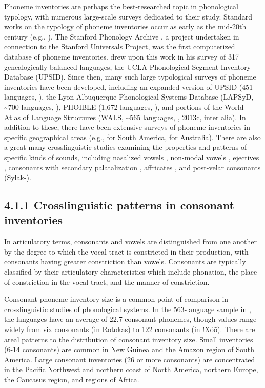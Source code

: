   Phoneme inventories are perhaps the best-researched topic in phonological typology, with numerous large-scale surveys dedicated to their study. Standard works on the typology of phoneme inventories occur as early as the mid-20th century (e.g., \citealt{Hockett1955}). The Stanford Phonology Archive \citep{CrothersEtAl1979}, a project undertaken in connection to the Stanford Universals Project, was the first computerized database of phoneme inventories. \citet{Maddieson1984} drew upon this work in his survey of 317 genealogically balanced languages, the UCLA Phonological Segment Inventory Database (UPSID). Since then, many such large typological surveys of phoneme inventories have been developed, including an expanded version of UPSID (451 languages, \citealt{MaddiesonPrecoda1990}), the Lyon-Albuquerque Phonological Systems Database (LAPSyD, {\textasciitilde}700 languages, \citealt{MaddiesonEtAl2013}), PHOIBLE (1,672 languages, \citealt{MoranEtAl2014}), and portions of the World Atlas of Language Structures (WALS, {\textasciitilde}565 languages, \citealt{Maddieson2013b}, 2013c, inter alia). In addition to these, there have been extensive surveys of phoneme inventories in specific geographical areas (e.g., \citealt{MichaelEtAl2015} for South America, \citealt{GasserBowern2014} for Australia). There are also a great many crosslinguistic studies examining the properties and patterns of specific kinds of sounds, including nasalized vowels \citep{Hajek2013}, non-modal vowels \citep{Gordon1998}, ejectives \citep{Fallon2002}, consonants with secondary palatalization \citep{Hall2000}, affricates \citep{Berns2013}, and post-velar consonants (Sylak-\citealt{Glassman2014}). 


\subsection{4.1.1 Crosslinguistic patterns in consonant inventories}

  In articulatory terms, consonants and vowels are distinguished from one another by the degree to which the vocal tract is constricted in their production, with consonants having greater constriction than vowels. Consonants are typically classified by their articulatory characteristics which include phonation, the place of constriction in the vocal tract, and the manner of constriction.



  Consonant phoneme inventory size is a common point of comparison in crosslinguistic studies of phonological systems. In the 563-language sample in \citet{Maddieson2013b}, the languages have an average of 22.7 consonant phonemes, though values range widely from six consonants (in Rotokas) to 122 consonants (in !Xóõ). There are areal patterns to the distribution of consonant inventory size. Small inventories (6-14 consonants) are common in New Guinea and the Amazon region of South America. Large consonant inventories (26 or more consonants) are concentrated in the Pacific Northwest and northern coast of North America, northern Europe, the Caucasus region, and regions of  Africa.



